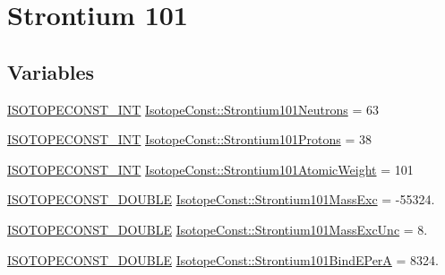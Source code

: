 \hypertarget{group___isotope_const-_strontium-_sr101}{}\section{Strontium 101}
\label{group___isotope_const-_strontium-_sr101}
\subsection*{Variables}
\begin{DoxyCompactItemize}
\item 
\mbox{\hyperlink{group___isotope_const-_macros_ga5f18360b3e99483a35c32d789e62621c}{I\+S\+O\+T\+O\+P\+E\+C\+O\+N\+S\+T\+\_\+\+I\+NT}} \mbox{\hyperlink{group___isotope_const-_strontium-_sr101_ga58ce6e2d3e3f405dde60c225396d612e}{Isotope\+Const\+::\+Strontium101\+Neutrons}} = 63
\item 
\mbox{\hyperlink{group___isotope_const-_macros_ga5f18360b3e99483a35c32d789e62621c}{I\+S\+O\+T\+O\+P\+E\+C\+O\+N\+S\+T\+\_\+\+I\+NT}} \mbox{\hyperlink{group___isotope_const-_strontium-_sr101_gae09310cc8ebd8435b397d1d472a1aec8}{Isotope\+Const\+::\+Strontium101\+Protons}} = 38
\item 
\mbox{\hyperlink{group___isotope_const-_macros_ga5f18360b3e99483a35c32d789e62621c}{I\+S\+O\+T\+O\+P\+E\+C\+O\+N\+S\+T\+\_\+\+I\+NT}} \mbox{\hyperlink{group___isotope_const-_strontium-_sr101_ga62da4ba628238048ea1529a4fdfb38ba}{Isotope\+Const\+::\+Strontium101\+Atomic\+Weight}} = 101
\item 
\mbox{\hyperlink{group___isotope_const-_macros_ga8f45a7272ce02c0b4c65c44636ed719a}{I\+S\+O\+T\+O\+P\+E\+C\+O\+N\+S\+T\+\_\+\+D\+O\+U\+B\+LE}} \mbox{\hyperlink{group___isotope_const-_strontium-_sr101_ga1aa00b08a0a3c016494b1d84bf8eee50}{Isotope\+Const\+::\+Strontium101\+Mass\+Exc}} = -\/55324.
\item 
\mbox{\hyperlink{group___isotope_const-_macros_ga8f45a7272ce02c0b4c65c44636ed719a}{I\+S\+O\+T\+O\+P\+E\+C\+O\+N\+S\+T\+\_\+\+D\+O\+U\+B\+LE}} \mbox{\hyperlink{group___isotope_const-_strontium-_sr101_ga244c881a16c521c9a398363dc36c9bb2}{Isotope\+Const\+::\+Strontium101\+Mass\+Exc\+Unc}} = 8.
\item 
\mbox{\hyperlink{group___isotope_const-_macros_ga8f45a7272ce02c0b4c65c44636ed719a}{I\+S\+O\+T\+O\+P\+E\+C\+O\+N\+S\+T\+\_\+\+D\+O\+U\+B\+LE}} \mbox{\hyperlink{group___isotope_const-_strontium-_sr101_gaa709ead1c928a23eabab34429d7ebdd3}{Isotope\+Const\+::\+Strontium101\+Bind\+E\+PerA}} = 8324.
\item 

\end{DoxyCompactItemize}
